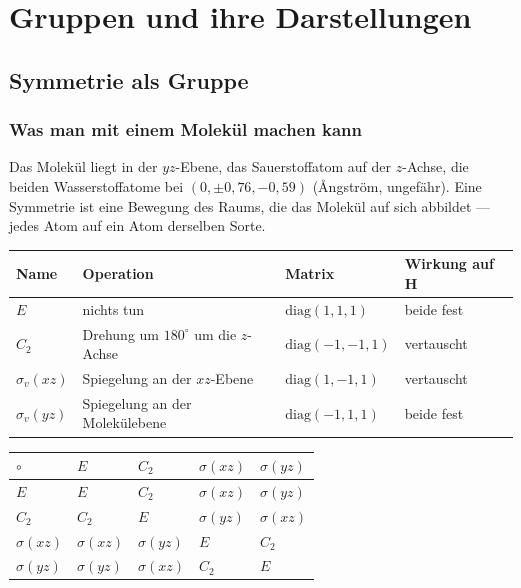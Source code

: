 \part{Gruppen und ihre Darstellungen}

\chapter{Symmetrie als Gruppe}

\section{Was man mit einem Molekül machen kann}

\begin{merksatz}
Das Molekül liegt in der $yz$-Ebene, das Sauerstoffatom auf der $z$-Achse, die beiden Wasserstoffatome bei $(0, \pm0{,}76, -0{,}59)$ (Ångström, ungefähr). Eine Symmetrie ist eine Bewegung des Raums, die das Molekül auf sich abbildet --- jedes Atom auf ein Atom derselben Sorte.

\begin{center}
{\small
\renewcommand{\arraystretch}{1.5}
\begin{tabular}{@{}P{1.2cm}P{2.8cm}P{2.6cm}P{2.0cm}@{}}
\toprule
\textbf{Name} & \textbf{Operation} & \textbf{Matrix} & \textbf{Wirkung auf H}\\
\midrule
$E$ & nichts tun & $\mathrm{diag}(1, 1, 1)$ & beide fest\\
$C_2$ & Drehung um $180^{\circ}$ um die $z$-Achse & $\mathrm{diag}(-1, -1, 1)$ & vertauscht\\
$\sigma_v(xz)$ & Spiegelung an der $xz$-Ebene & $\mathrm{diag}(1, -1, 1)$ & vertauscht\\
$\sigma_v(yz)$ & Spiegelung an der Molekülebene & $\mathrm{diag}(-1, 1, 1)$ & beide fest\\
\bottomrule
\end{tabular}}
\end{center}

\begin{center}
{\small
\renewcommand{\arraystretch}{1.46}
\begin{tabular}{@{}P{1.4cm}P{1.2cm}P{1.2cm}P{1.4cm}P{1.4cm}@{}}
\toprule
$\circ$ & $E$ & $C_2$ & $\sigma(xz)$ & $\sigma(yz)$\\
\midrule
$E$ & $E$ & $C_2$ & $\sigma(xz)$ & $\sigma(yz)$\\
$C_2$ & $C_2$ & $E$ & $\sigma(yz)$ & $\sigma(xz)$\\
$\sigma(xz)$ & $\sigma(xz)$ & $\sigma(yz)$ & $E$ & $C_2$\\
$\sigma(yz)$ & $\sigma(yz)$ & $\sigma(xz)$ & $C_2$ & $E$\\
\bottomrule
\end{tabular}}
\end{center}


\end{merksatz}
